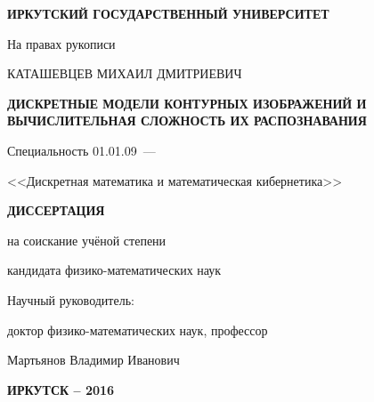 \thispagestyle{empty}

\begin{center}
\MakeTextUppercase{\bf Иркутский государственный университет}
\par
\end{center}

\vspace{5mm}
\begin{flushright}
На правах рукописи

\end{flushright}

\vspace{10mm}
\begin{center}
{\large КАТАШЕВЦЕВ МИХАИЛ ДМИТРИЕВИЧ}
\end{center}

\vspace{5mm}
\begin{center}
{\bf \large \MakeTextUppercase{Дискретные модели контурных изображений и вычислительная сложность их распознавания}
\par}

\vspace{10mm}
{%
Специальность 01.01.09~---

<<Дискретная математика и математическая кибернетика>>
}

\vspace{10mm}
\textbf{\MakeTextUppercase{Диссертация}}

на соискание учёной степени

кандидата физико-математических наук
\end{center}

\vspace{20mm}
\begin{flushright}
Научный руководитель:

доктор физико-математических наук, профессор

Мартьянов Владимир Иванович

\end{flushright}

\vspace{20mm}
\begin{center}
\textbf{\MakeTextUppercase{Иркутск -- 2016}}
\end{center}

\newpage